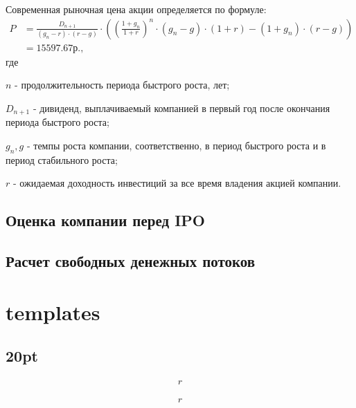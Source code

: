 \documentclass[12pt, table, a4paper,twoside]{exam}
\begin{document}
\begin{questions}
\begin{solution}[12em]
	
	\raggedright
	Современная рыночная цена акции определяется по формуле:
	\begin{align}
	P &=\frac{D_{n + 1}}{(g_n - r) \cdot (r - g)} \cdot \left( \left( \frac{1 + g_n}{1 + r} \right)^n \cdot (g_n - g) \cdot (1 + r) - (1 + g_n) \cdot (r - g)  \right)\\
	&=15 597.67\text{р.},\nonumber
	\end{align}
	где
	
	$n$ - продолжительность периода быстрого роста, лет;	
	
	$D_{n + 1}$ - дивиденд, выплачиваемый компанией в первый год после окончания периода быстрого роста;

	$g_n, g$ - темпы роста компании, соответственно, в период быстрого роста и в период стабильного роста;	

	$r$ - ожидаемая доходность инвестиций за все время владения акцией компании.	

\end{solution}

\subsection{Оценка компании перед IPO}

\subsection{Расчет свободных денежных потоков}


\cleardoublepage
\section{templates}

\subsection{20pt}
\question[20] 
\noaddpoints

\begin{subparts}
	\subpart[10] 
	
	\begin{solution}[12em]
		\begin{align*}
		r
		\end{align*}
	\end{solution}
	
	\subpart[10] 
	
	\begin{solution}[12em]
		\begin{align*}
		r
		\end{align*}
	\end{solution}
	

\end{subparts}
\end{questions}
\end{document}
